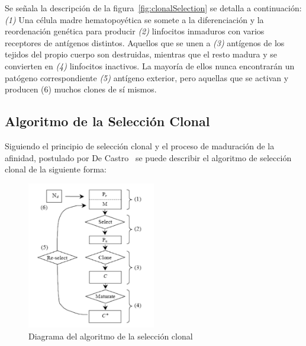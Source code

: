 Se señala la descripción de la figura~\ref{fig:clonalSelection} se detalla a continuación:
\emph{(1)} Una célula madre hematopoyética se somete a la diferenciación y
la reordenación genética para producir \emph{(2)} linfocitos inmaduros con
varios receptores de antígenos distintos.
Aquellos que se unen a \emph{(3)} antígenos de los tejidos del propio cuerpo
son destruidas, mientras que el resto madura y se convierten en \emph{(4)} linfocitos
inactivos. La mayoría de ellos nunca encontrarán un patógeno correspondiente \emph{(5)}
antígeno exterior, pero aquellas que se activan y producen (6) muchos clones de sí mismos.

\subsection{Algoritmo de la Selección Clonal}

Siguiendo el principio de selección clonal y el proceso de maduración de la afinidad, postulado por De Castro~\cite{decastro} se puede describir el algoritmo de selección clonal de la siguiente forma:
\begin{figure}[h!]
\begin{center}
\includegraphics[width=0.5\textwidth]{img/algoritmo}
\end{center}
\caption{Diagrama del algoritmo de la selección clonal}
\label{fig:algoritmo}
\end{figure}

